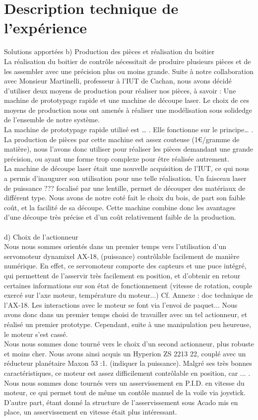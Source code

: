 \documentclass[a4paper,twoside,12pt]{article}
\newcounter{partie}
\newcounter{sous-partie}
\newenvironment{partie}[1]
{
\section{#1}
}
{

}
\newenvironment{sous-partie}[1]
{
\subsection{#1}
}
{

}
\begin{document}
\begin{partie}{Description technique de l'expérience}
\begin{sous-partie}{Solutions apportées}
b) Production des pièces et réalisation du boitier\\
La réalisation du boitier de contrôle nécessitait de produire plusieurs pièces et de les assembler avec une précision plus ou moins grande. %
Suite à notre collaboration avec Monsieur Martinelli, professeur à l'IUT de Cachan, nous avons décidé d'utiliser deux moyens de production pour réaliser nos pièces, à savoir : Une machine de prototypage rapide et une machine de découpe laser. %
Le choix de ces moyens de production nous ont amenés à réaliser une modélisation sous solidedge de l'ensemble de notre système. %
\\
La machine de prototypage rapide utilisé est … . %
Elle fonctionne sur le principe… . %
La production de pièces par cette machine est assez couteuse (1€/gramme de matière), nous l'avons donc utiliser pour réaliser les pièces demandant une grande précision, ou ayant une forme trop complexe pour être réalisée autrement.\\
La machine de découpe laser était une nouvelle acquisition de l'IUT, ce qui nous a permis d'inaugurer son utilisation pour une telle réalisation. %
Un faisceau laser de puissance ??? %
focalisé par une lentille, permet de découper des matériaux de différent type. %
Nous avons de notre coté fait le choix du bois, de part son faible coût, et la facilité de sa découpe. %
Cette machine combine donc les avantages d'une découpe très précise et d'un coût relativement faible de la production.\\
\\

d) Choix de l'actionneur\\
Nous nous sommes orientés dans un premier temps vers l'utilisation d'un servomoteur dynamixel AX-18, (puissance) contrôlable facilement de manière numérique. %
En effet, ce servomoteur comporte des capteurs et une puce intégré, qui permettent de l'asservir très facilement en position, et d'obtenir en retour certaines informations sur son état de fonctionnement (vitesse de rotation, couple exercé sur l'axe moteur, température du moteur...) Cf. %
Annexe : doc technique de l'AX-18. %
Les interactions avec le moteur se font via l'envoi de paquet... %
Nous avons donc dans un premier temps choisi de travailler avec un tel actionneur, et réalisé un premier prototype. %
Cependant, suite à une manipulation peu heureuse, le moteur s'est cassé.\\
Nous nous sommes donc tourné vers le choix d'un second actionneur, plus robuste et moins cher. %
Nous avons ainsi acquis un Hyperion ZS 2213 22, couplé avec un réducteur planétaire Maxon 53 :1. %
(indiquer la puissance). %
Malgré ses très bonnes caractéristiques, ce moteur est assez difficilement contrôlable en position, car ... %
. %
Nous nous sommes donc tournés vers un asservissement en P.I.D. %
en vitesse du moteur, ce qui permet tout de même un contôle manuel de la voile via joystick. %
D'autre part, étant donné la structure de l'asservissement sous Acado mis en place, un asservissement en vitesse était plus intéressant.
\\


\end{sous-partie}
\end{partie}
\end{document}
